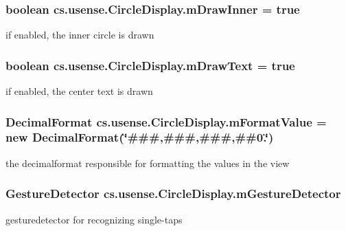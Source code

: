 \subsubsection[{m\+Draw\+Inner}]{\setlength{\rightskip}{0pt plus 5cm}boolean cs.\+usense.\+Circle\+Display.\+m\+Draw\+Inner = true\hspace{0.3cm}{\ttfamily [private]}}\label{classcs_1_1usense_1_1_circle_display_ad73b22a7a1f3f35d8544cdb7c80f42b2}
if enabled, the inner circle is drawn \hypertarget{classcs_1_1usense_1_1_circle_display_a60190dd53d27e5e1696997ab75532326}{}
\subsubsection[{m\+Draw\+Text}]{\setlength{\rightskip}{0pt plus 5cm}boolean cs.\+usense.\+Circle\+Display.\+m\+Draw\+Text = true\hspace{0.3cm}{\ttfamily [private]}}\label{classcs_1_1usense_1_1_circle_display_a60190dd53d27e5e1696997ab75532326}
if enabled, the center text is drawn \hypertarget{classcs_1_1usense_1_1_circle_display_a4f87a1f93144b66dc88a881347bd4a8e}{}
\subsubsection[{m\+Format\+Value}]{\setlength{\rightskip}{0pt plus 5cm}Decimal\+Format cs.\+usense.\+Circle\+Display.\+m\+Format\+Value = new Decimal\+Format(\char`\"{}\#\#\#,\#\#\#,\#\#\#,\#\#0.\char`\"{})\hspace{0.3cm}{\ttfamily [private]}}\label{classcs_1_1usense_1_1_circle_display_a4f87a1f93144b66dc88a881347bd4a8e}
the decimalformat responsible for formatting the values in the view \hypertarget{classcs_1_1usense_1_1_circle_display_ab12257b390772bc6513cf1ee49b9b729}{}
\subsubsection[{m\+Gesture\+Detector}]{\setlength{\rightskip}{0pt plus 5cm}Gesture\+Detector cs.\+usense.\+Circle\+Display.\+m\+Gesture\+Detector\hspace{0.3cm}{\ttfamily [private]}}\label{classcs_1_1usense_1_1_circle_display_ab12257b390772bc6513cf1ee49b9b729}
gesturedetector for recognizing single-\/taps \hypertarget{classcs_1_1usense_1_1_circle_display_a40cb3444d9793dd9e98e8bfe6e178764}{}
